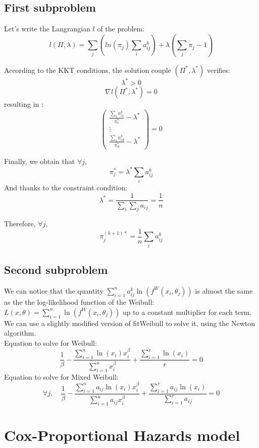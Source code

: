 \documentclass[a4paper,11pt]{article}
\begin{document}
\begin{itemize}
\subsection{First subproblem}

Let's write the Langrangian $l$ of the problem:
$$ l(\Pi,\lambda) = \sum_j \left( ln(\pi_j) \sum_i a_{ij}^k \right)  + \lambda \left( \sum_{j} \pi_j - 1 \right) $$

According to the KKT conditions, the solution couple $(\Pi^*,\lambda^*)$ verifies:
$$ \lambda^* > 0 $$
$$ \nabla l (\Pi^*,\lambda^*) = 0 $$
resulting in :
$$ \begin{pmatrix} \frac{\sum_i a_{i1}^k}{\pi_1^*} - \lambda^* \\ \vdots \\ \frac{\sum_i a_{iS}^k}{\pi_S^*} - \lambda^* \end{pmatrix}  = 0 $$

Finally, we obtain that $\forall j$,
$$ \pi_j^* = \lambda^* \sum_i a_{ij}^k $$
And thanks to the constraint condition:
$$ \lambda^* = \frac{1}{\sum_i\sum_j a_{ij}} = \frac{1}{n} $$

Therefore, $\forall j$, 
$$ \pi_j^{(k+1)*} = \frac{1}{n} \sum_i a_{ij}^k $$

\subsection{Second subproblem}

We can notice that the quantity $ \sum_{i=1}^{n} a_{ij}^k \ln \left(f^W (x_i,\theta_j)\right) $ is almost the same as the the log-likelihood function of the Weibull: $ L(x,\theta) = \sum_{i=1}^{n} \ln \left(f^W (x_i,\theta_j)\right)$ up to a constant multiplier for each term. \\

We can use a slightly modified version of fitWeibull to solve it, using the Newton algorithm. \\

Equation to solve for Weibull:
$$ \frac{1}{\beta} - \frac{\sum_{i=1}^{n} \ln (x_i) x_i^{\beta}}{\sum_{i=1}^{n} x_i^{\beta}} + \frac{\sum_{i=1}^{r} \ln (x_i)}{r} = 0 $$
Equation to solve for Mixed Weibull:
$$\forall j, \quad \frac{1}{\beta} - \frac{\sum_{i=1}^{n} a_{ij} \ln (x_i) x_i^{\beta}}{\sum_{i=1}^{n} a_{ij} x_i^{\beta}} + \frac{\sum_{i=1}^{r} a_{ij} \ln (x_i)}{\sum_{i=1}^{r} a_{ij}} = 0 $$

\end{itemize}

\section{Cox-Proportional Hazards model}
\end{document}
